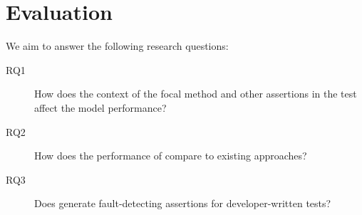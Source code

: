 
\section{Evaluation}

We aim to answer the following research questions:

\begin{description}

\item[RQ1] How does the context of the focal method and other
  assertions in the test affect the model performance?

\item[RQ2] How does the performance of \assertfive compare to existing
  approaches?

\item[RQ3] Does \assertfive generate fault-detecting assertions for
  developer-written tests?

\end{description}


